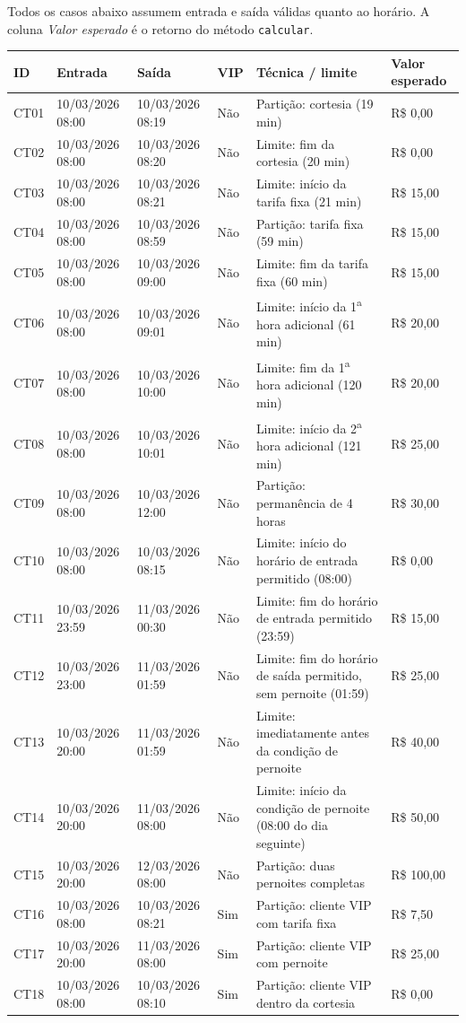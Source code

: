 \documentclass[11pt,a4paper]{article}
\begin{document}
Todos os casos abaixo assumem entrada e saída válidas quanto ao horário. A coluna
\emph{Valor esperado} é o retorno do método \texttt{calcular}.

\begin{longtable}{@{}p{1.4cm}p{2.6cm}p{2.9cm}p{0.8cm}p{2.7cm}p{2.3cm}@{}}
\toprule
\textbf{ID} & \textbf{Entrada} & \textbf{Saída} & \textbf{VIP} & \textbf{Técnica / limite} & \textbf{Valor esperado} \\
\midrule
\endhead
CT01 & 10/03/2026 08:00 & 10/03/2026 08:19 & Não & Partição: cortesia (19 min) & R\$ 0,00 \\
CT02 & 10/03/2026 08:00 & 10/03/2026 08:20 & Não & Limite: fim da cortesia (20 min) & R\$ 0,00 \\
CT03 & 10/03/2026 08:00 & 10/03/2026 08:21 & Não & Limite: início da tarifa fixa (21 min) & R\$ 15,00 \\
CT04 & 10/03/2026 08:00 & 10/03/2026 08:59 & Não & Partição: tarifa fixa (59 min) & R\$ 15,00 \\
CT05 & 10/03/2026 08:00 & 10/03/2026 09:00 & Não & Limite: fim da tarifa fixa (60 min) & R\$ 15,00 \\
CT06 & 10/03/2026 08:00 & 10/03/2026 09:01 & Não & Limite: início da 1\textsuperscript{a} hora adicional (61 min) & R\$ 20,00 \\
CT07 & 10/03/2026 08:00 & 10/03/2026 10:00 & Não & Limite: fim da 1\textsuperscript{a} hora adicional (120 min) & R\$ 20,00 \\
CT08 & 10/03/2026 08:00 & 10/03/2026 10:01 & Não & Limite: início da 2\textsuperscript{a} hora adicional (121 min) & R\$ 25,00 \\
CT09 & 10/03/2026 08:00 & 10/03/2026 12:00 & Não & Partição: permanência de 4 horas & R\$ 30,00 \\
CT10 & 10/03/2026 08:00 & 10/03/2026 08:15 & Não & Limite: início do horário de entrada permitido (08:00) & R\$ 0,00 \\
CT11 & 10/03/2026 23:59 & 11/03/2026 00:30 & Não & Limite: fim do horário de entrada permitido (23:59) & R\$ 15,00 \\
CT12 & 10/03/2026 23:00 & 11/03/2026 01:59 & Não & Limite: fim do horário de saída permitido, sem pernoite (01:59) & R\$ 25,00 \\
CT13 & 10/03/2026 20:00 & 11/03/2026 01:59 & Não & Limite: imediatamente antes da condição de pernoite & R\$ 40,00 \\
CT14 & 10/03/2026 20:00 & 11/03/2026 08:00 & Não & Limite: início da condição de pernoite (08:00 do dia seguinte) & R\$ 50,00 \\
CT15 & 10/03/2026 20:00 & 12/03/2026 08:00 & Não & Partição: duas pernoites completas & R\$ 100,00 \\
CT16 & 10/03/2026 08:00 & 10/03/2026 08:21 & Sim & Partição: cliente VIP com tarifa fixa & R\$ 7,50 \\
CT17 & 10/03/2026 20:00 & 11/03/2026 08:00 & Sim & Partição: cliente VIP com pernoite & R\$ 25,00 \\
CT18 & 10/03/2026 08:00 & 10/03/2026 08:10 & Sim & Partição: cliente VIP dentro da cortesia & R\$ 0,00 \\
\bottomrule
\end{longtable}
\end{document}

